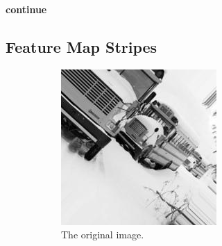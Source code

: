 \textbf{continue}


\subsection{Feature Map Stripes}\label{subsec:feature-map-stripes}

\begin{figure}
    \centering
    \begin{subfigure}{0.3\textwidth}
        \centering
        \includegraphics[width=\textwidth]{images/stripes/original.jpg}
        \caption{The original image.}
        \label{subfig:stripes_original}
    \end{subfigure}
    \hfill
    \begin{subfigure}{0.3\textwidth}
        \centering

\end{subfigure}
\end{figure}
